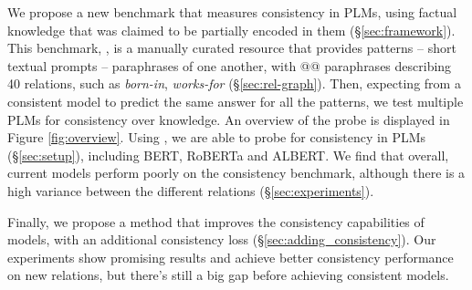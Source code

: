 We propose a new benchmark that measures consistency in PLMs, using factual knowledge that was claimed to be partially encoded in them (\S \ref{sec:framework}).
This benchmark, \resource{}, is a manually curated resource that provides patterns -- short textual prompts -- paraphrases of one another, with @@ paraphrases describing 40 relations, such as \textit{born-in}, \textit{works-for} (\S \ref{sec:rel-graph}).
Then, expecting from a consistent model to predict the same answer for all the patterns, we test multiple PLMs for consistency over knowledge.
An overview of the probe is displayed in Figure \ref{fig:overview}.
Using \resource{}, we are able to probe for consistency in PLMs (\S \ref{sec:setup}), including BERT, RoBERTa and ALBERT.
We find that overall, current models perform poorly on the consistency benchmark, although there is a high variance between the different relations (\S \ref{sec:experiments}). 

Finally, we propose a method that improves the consistency capabilities of models, with an additional consistency loss (\S \ref{sec:adding_consistency}). Our experiments show promising results and achieve better consistency performance on new relations, but there's still a big gap before achieving consistent models.






